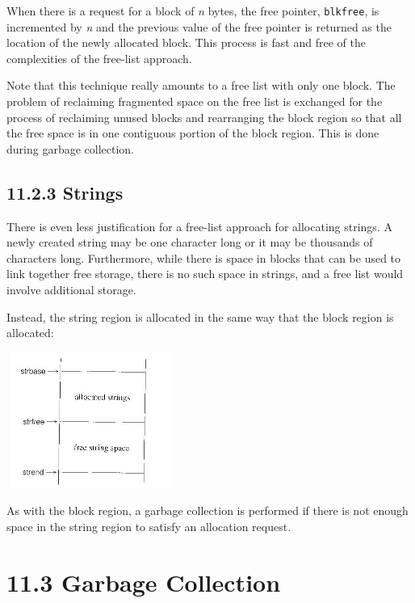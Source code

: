 When there is a request for a block of \textit{n} bytes, the free
pointer, \texttt{blkfree}, is incremented by \textit{n} and the
previous value of the free pointer is returned as the location of the
newly allocated block. This process is fast and free of the
complexities of the free-list approach.


Note that this technique really amounts to a free list with only one
block. The problem of reclaiming fragmented space on the free list is
exchanged for the process of reclaiming unused blocks and rearranging
the block region so that all the free space is in one contiguous
portion of the block region. This is done during garbage collection.

\subsection[11.2.3 Strings]{11.2.3 Strings}

There is even less justification for a free-list approach for
allocating strings. A newly created string may be one character long
or it may be thousands of characters long. Furthermore, while there is
space in blocks that can be used to link together free storage, there
is no such space in strings, and a free list would involve additional
storage.

Instead, the string region is allocated in the same way that the block
region is allocated:

\begin{center}
\includegraphics[width=2.1799in,height=1.7492in]{ib-img/ib-img089.jpg}
\end{center}

As with the block region, a garbage collection is performed if there
is not enough space in the string region to satisfy an allocation
request.


\section[11.3 Garbage Collection]{11.3 Garbage Collection}

